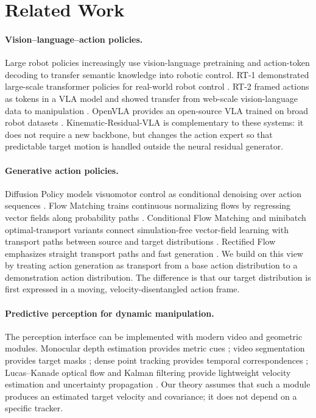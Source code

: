 \documentclass[10pt,twocolumn,letterpaper]{article}
\begin{document}
\section{Related Work}
\label{sec:related}

\paragraph{Vision--language--action policies.}
Large robot policies increasingly use vision-language pretraining and action-token decoding to transfer semantic knowledge into robotic control. RT-1 demonstrated large-scale transformer policies for real-world robot control \citep{brohan2023rt1}. RT-2 framed actions as tokens in a VLA model and showed transfer from web-scale vision-language data to manipulation \citep{zitkovich2023rt2}. OpenVLA provides an open-source VLA trained on broad robot datasets \citep{kim2024openvla}. Kinematic-Residual-VLA is complementary to these systems: it does not require a new backbone, but changes the action expert so that predictable target motion is handled outside the neural residual generator.

\paragraph{Generative action policies.}
Diffusion Policy models visuomotor control as conditional denoising over action sequences \citep{chi2023diffusionpolicy}. Flow Matching trains continuous normalizing flows by regressing vector fields along probability paths \citep{lipman2023flow}. Conditional Flow Matching and minibatch optimal-transport variants connect simulation-free vector-field learning with transport paths between source and target distributions \citep{tong2024improving}. Rectified Flow emphasizes straight transport paths and fast generation \citep{liu2023rectified}. We build on this view by treating action generation as transport from a base action distribution to a demonstration action distribution. The difference is that our target distribution is first expressed in a moving, velocity-disentangled action frame.

\paragraph{Predictive perception for dynamic manipulation.}
The perception interface can be implemented with modern video and geometric modules. Monocular depth estimation provides metric cues \citep{yang2024depthanythingv2}; video segmentation provides target masks \citep{ravi2024sam2}; dense point tracking provides temporal correspondences \citep{karaev2024cotracker}; Lucas--Kanade optical flow and Kalman filtering provide lightweight velocity estimation and uncertainty propagation \citep{lucas1981iterative,kalman1960filtering}. Our theory assumes that such a module produces an estimated target velocity and covariance; it does not depend on a specific tracker.
\end{document}
